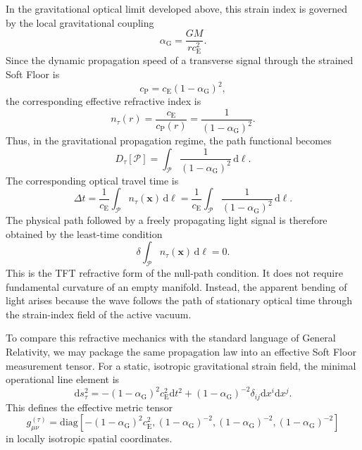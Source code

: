 In the gravitational optical limit developed above, this strain index is governed by the local gravitational coupling
\begin{equation}
    \alpha_{\mathrm{G}} = \frac{GM}{rc_{\mathrm{E}}^2}.
\end{equation}
Since the dynamic propagation speed of a transverse signal through the strained Soft Floor is
\begin{equation}
    c_{\mathrm{P}} = c_{\mathrm{E}}(1-\alpha_{\mathrm{G}})^2,
\end{equation}
the corresponding effective refractive index is
\begin{equation}
    n_\tau(r) = \frac{c_{\mathrm{E}}}{c_{\mathrm{P}}(r)} = \frac{1}{(1-\alpha_{\mathrm{G}})^2}.
\end{equation}
Thus, in the gravitational propagation regime, the path functional becomes
\begin{equation}
    D_\tau[\mathcal{P}] = \int_{\mathcal{P}} \frac{1}{(1-\alpha_{\mathrm{G}})^2} \, \mathrm{d}\ell .
\end{equation}
The corresponding optical travel time is
\begin{equation}
    \Delta t = \frac{1}{c_{\mathrm{E}}} \int_{\mathcal{P}} n_\tau(\mathbf{x}) \, \mathrm{d}\ell = \frac{1}{c_{\mathrm{E}}} \int_{\mathcal{P}} \frac{1}{(1-\alpha_{\mathrm{G}})^2} \, \mathrm{d}\ell .
\end{equation}
The physical path followed by a freely propagating light signal is therefore obtained by the least-time condition
\begin{equation}
    \delta \int_{\mathcal{P}} n_\tau(\mathbf{x}) \, \mathrm{d}\ell = 0.
\end{equation}
This is the TFT refractive form of the null-path condition. It does not require fundamental curvature of an empty manifold. Instead, the apparent bending of light arises because the wave follows the path of stationary optical time through the strain-index field of the active vacuum.

To compare this refractive mechanics with the standard language of General Relativity, we may package the same propagation law into an effective Soft Floor measurement tensor. For a static, isotropic gravitational strain field, the minimal operational line element is
\begin{equation}
    \mathrm{d}s_\tau^2 = -(1-\alpha_{\mathrm{G}})^2 c_{\mathrm{E}}^2 \mathrm{d}t^2 + (1-\alpha_{\mathrm{G}})^{-2} \delta_{ij} \mathrm{d}x^i \mathrm{d}x^j .
\end{equation}
This defines the effective metric tensor
\begin{equation}
    g_{\mu\nu}^{(\tau)} = \mathrm{diag} \left[ -(1-\alpha_{\mathrm{G}})^2 c_{\mathrm{E}}^2, (1-\alpha_{\mathrm{G}})^{-2}, (1-\alpha_{\mathrm{G}})^{-2}, (1-\alpha_{\mathrm{G}})^{-2} \right]
\end{equation}
in locally isotropic spatial coordinates.

